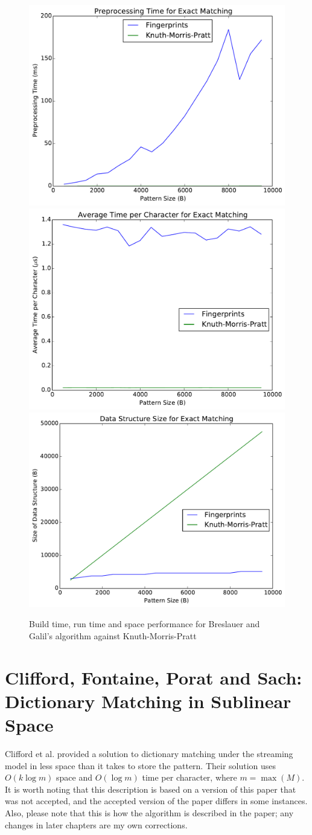 \documentclass[ %
                    author={Dominic Joseph Moylett},
                    degree={MEng},
                     title={Dictionary Matching with Fingerprints},
                  subtitle={An Empirical Analysis},
                      type={research},
                      year={2015} ]{dissertation}
\begin{document}
\begin{figure}[t]
\begin{center}
  \includegraphics[width=0.5\linewidth]{summer_build_time}\\
  \includegraphics[width=0.5\linewidth]{summer_run_time}\includegraphics[width=0.5\linewidth]{summer_size}
\end{center}
\caption{Build time, run time and space performance for Breslauer and Galil's algorithm against Knuth-Morris-Pratt}
\label{fig:summer-results}
\end{figure}

\section{Clifford, Fontaine, Porat and Sach: Dictionary Matching in Sublinear Space}
\label{sec:theory-clifford}

Clifford et al.\@ \cite{2015arXiv150406242C} provided a solution to dictionary matching under the streaming model in less space than it takes to store the pattern. Their solution uses $O(k\log m)$ space and $O(\log m)$ time per character, where $m = \max(M)$. It is worth noting that this description is based on a version of this paper that was not accepted, and the accepted version of the paper differs in some instances. Also, please note that this is how the algorithm is described in the paper; any changes in later chapters are my own corrections.
\end{document}
